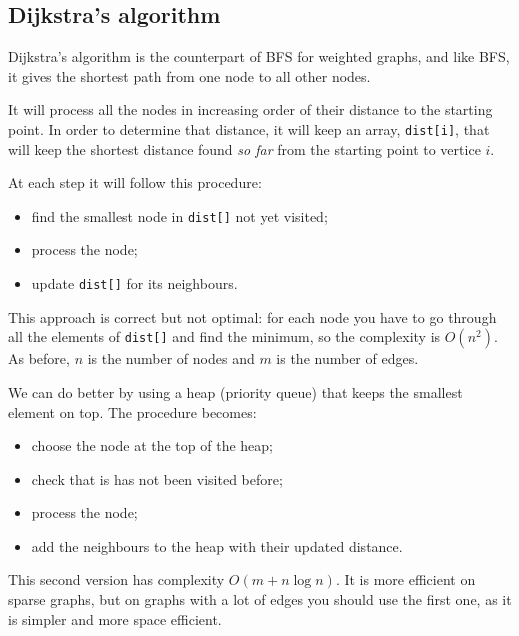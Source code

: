 \subsection{Dijkstra's algorithm}

Dijkstra's algorithm is the counterpart of BFS for weighted graphs,
and like BFS, it gives the shortest path from one node to all other nodes.

It will process all the nodes in increasing order of their distance
to the starting point.
In order to determine that distance, it will keep an array,
\texttt{dist[i]},
that will keep the shortest distance found \emph{so far}
from the starting point to vertice $i$.

At each step it will follow this procedure:
\begin{itemize}
    \item find the smallest node in \texttt{dist[]} not yet visited;
    \item process the node;
    \item update \texttt{dist[]} for its neighbours.
\end{itemize}

This approach is correct but not optimal:
for each node you have to go through all the elements of \texttt{dist[]}
and find the minimum, so the complexity is $O(n^2)$.
As before, $n$ is the number of nodes and $m$ is the number of edges.

We can do better by using a heap (priority queue)
that keeps the smallest element on top.
The procedure becomes:
\begin{itemize}
    \item choose the node at the top of the heap;
    \item check that is has not been visited before;
    \item process the node;
    \item add the neighbours to the heap with their updated distance.
\end{itemize}

This second version has complexity $O(m + n\log n)$.
It is more efficient on sparse graphs, but on graphs with a lot of edges
you should use the first one, as it is simpler and more space efficient.
